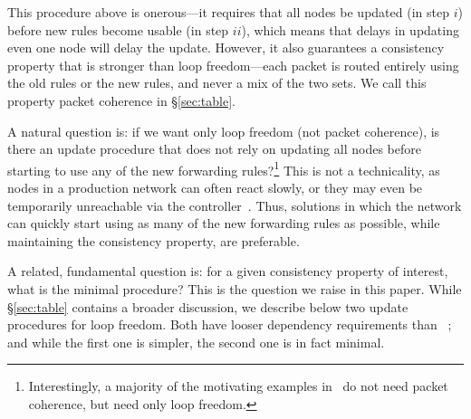 
This procedure above is onerous---it requires that all nodes be updated (in step $i$) before new rules become usable (in step $ii$), which means that delays in updating even one node will delay the update. However, it also guarantees a consistency property that is stronger than loop freedom---each packet is routed entirely using the old rules or the new rules, and never a mix of the two sets. We call this property packet coherence in \S\ref{sec:table}.

A natural question is: if we want only loop freedom (not packet coherence), is there an update procedure that does not rely on updating all nodes before starting to use any of the new forwarding rules?\footnote{Interestingly, a majority of the motivating examples in~\cite{safeupdate} do not need packet coherence, but need only loop freedom.}  This is not a technicality, as nodes in a production network can often react slowly, or they may even be temporarily unreachable via the controller~\cite{b4}.  Thus, solutions in which the network can quickly start using as many of the new forwarding rules as possible, while maintaining the consistency property, are preferable.

A related, fundamental question is: for a given consistency property of interest, what is the minimal procedure? This is the question we raise in this paper. While \S\ref{sec:table} contains a broader discussion, we describe below two update procedures for loop freedom. Both have looser dependency requirements than ~\cite{safetupdate}; and while the first one is simpler, the second one is in fact minimal.



